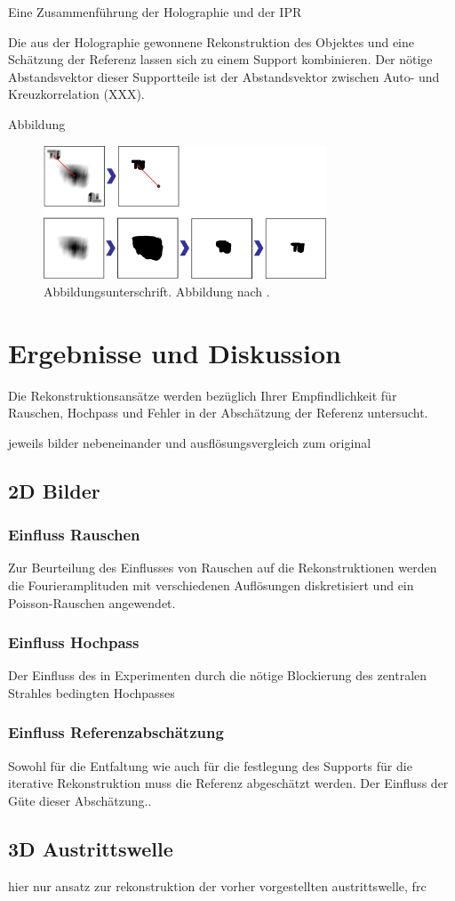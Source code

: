 Eine Zusammenführung der Holographie und der IPR 

Die aus der Holographie gewonnene Rekonstruktion des Objektes und eine Schätzung der Referenz lassen sich zu einem Support kombinieren. Der nötige Abstandsvektor dieser Supportteile ist der  Abstandsvektor zwischen Auto- und Kreuzkorrelation (XXX).

Abbildung
	\begin{figure}
		\centering
		\includegraphics[width=0.75\textwidth]{images/support.eps}
		\caption[Abbildungstext im Abbildungsverzeichnis]{Abbildungsunterschrift. Abbildung nach \cite{B-SViel}.}
		\label{Abb:BspAbbildung}
	\end{figure} 



\section{Ergebnisse und Diskussion}
Die Rekonstruktionsansätze werden bezüglich Ihrer Empfindlichkeit für Rauschen, Hochpass und Fehler in der Abschätzung der Referenz untersucht.

jeweils bilder nebeneinander und ausflösungsvergleich zum original

\subsection{2D Bilder}
\subsubsection{Einfluss Rauschen}
Zur Beurteilung des Einflusses von Rauschen auf die Rekonstruktionen werden die Fourieramplituden mit verschiedenen Auflösungen diskretisiert und ein Poisson-Rauschen angewendet.
\subsubsection{Einfluss Hochpass}
Der Einfluss des in Experimenten durch die nötige Blockierung des zentralen Strahles bedingten Hochpasses
\subsubsection{Einfluss Referenzabschätzung}
Sowohl für die Entfaltung wie auch für die festlegung des Supports für die iterative Rekonstruktion muss die Referenz abgeschätzt werden. Der Einfluss der Güte dieser Abschätzung..

\subsection{3D Austrittswelle}

hier nur ansatz zur rekonstruktion der vorher vorgestellten austrittswelle, frc

